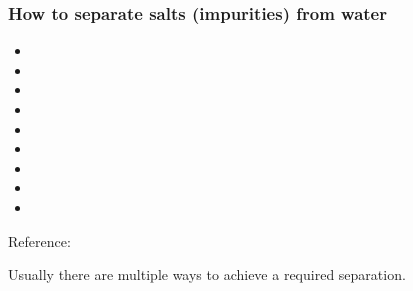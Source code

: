 \begin{frame}\frametitle{How to separate salts (impurities) from water}
	\begin{itemize}
		\item	\iftoggle{instructor}{\href{http://en.wikipedia.org/wiki/Electrodialysis}{electrodialysis}}{\href{http://en.wikipedia.org/wiki/Electrodialysis}{electrodialysis}}
		\item	\iftoggle{instructor}{\href{http://en.wikipedia.org/wiki/Electrodeionization}{electrodeionization}}{\href{http://en.wikipedia.org/wiki/Electrodeionization}{electrodeionization}}
		\item	\pause\iftoggle{instructor}{evaporation through heating with condensation}{}
		\item	\iftoggle{instructor}{evaporation under vacuum}{}
		\item	\iftoggle{instructor}{freezing to form ice crystals}{}
		\item	\iftoggle{instructor}{reverse osmosis}{}
		\item	\iftoggle{instructor}{ion exchange}{}
		\item	\iftoggle{instructor}{apply pressure and force it through a membrane that delays (filters out) salts}{}
		\item	\iftoggle{instructor}{add a solvent to preferentially take up water}{}
	\end{itemize}
	Reference: 
	\vspace{12pt}

	Usually there are multiple ways to achieve a required separation.
\end{frame}

